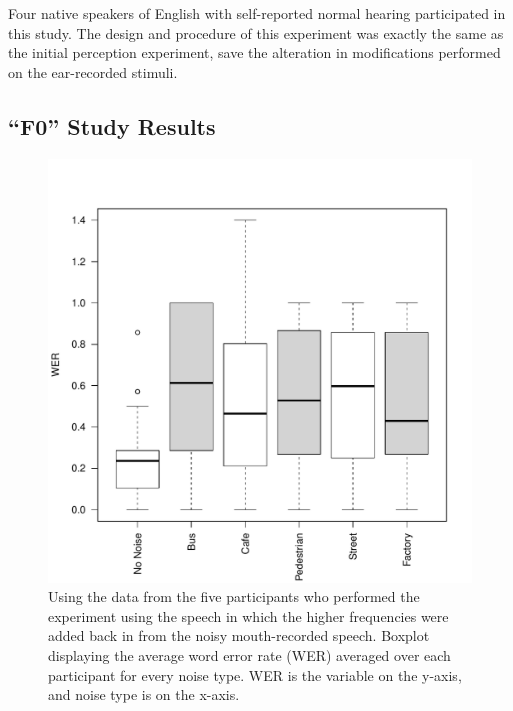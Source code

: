 \documentclass[dissertation,copyright]{uathesis}
\makeatletter
\def\maxwidth{ %
  \ifdim\Gin@nat@width>\linewidth
    \linewidth
  \else
    \Gin@nat@width
  \fi
}
\makeatother
\begin{document}
Four native speakers of English with self-reported normal hearing participated in this study.  The design and procedure of this experiment was exactly the same as the initial perception experiment, save the alteration in modifications performed on the ear-recorded stimuli.


\subsection{``F0'' Study Results}

\begin{figure}

\includegraphics[width=\maxwidth]{figure/F0_boxplot_noise-1} 

\caption{Using the data from the five participants who performed the experiment using the speech in which the higher frequencies were added back in from the noisy mouth-recorded speech.  Boxplot displaying the average word error rate (WER) averaged over each participant for every noise type. WER is the variable on the y-axis, and noise type is on the x-axis.}
\label{fig:F0_noise_boxplot}
\end{figure}
\end{document}
